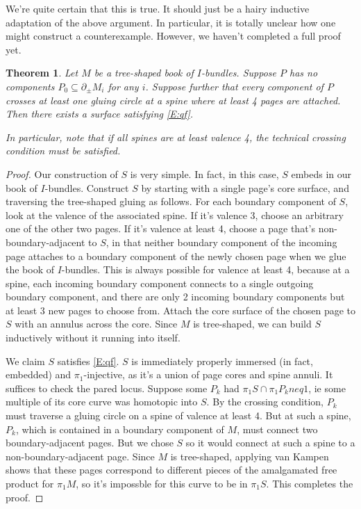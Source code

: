 \documentclass[12pt]{amsart}
\newtheorem{thm}[theorem]{Theorem}
\theoremstyle{definition}
\theoremstyle{remark}
\newcommand{\bd}{\partial}
\newcommand{\cin}{\subseteq}
\begin{document}
{We're quite certain that this is true. It should just be a hairy inductive
adaptation of the above argument. In particular, it is totally unclear how one
might construct a counterexample. However, we haven't completed a full proof
yet.

\begin{thm}

Let $M$ be a tree-shaped book of $I$-bundles. Suppose $P$ has no components
$P_0 \cin \bd_\pm M_i$ for any $i$. Suppose further that every
component of $P$ crosses at least one gluing circle at a spine where at least
4 pages are attached. Then there exists a surface satisfying \eqref{E:qf}.

In particular, note that if all spines are at least valence 4, the technical
crossing condition must be satisfied.

\end{thm}
\begin{proof}

Our construction of $S$ is very simple. In fact, in this case, $S$ embeds in
our book of $I$-bundles. Construct $S$ by starting with a single page's core
surface, and traversing the tree-shaped gluing as follows. For each boundary
component of $S$, look at the valence of the associated spine. If it's valence
3, choose an arbitrary one of the other two pages. If it's valence at least 4,
choose a page that's non-boundary-adjacent to $S$, in that neither boundary
component of the incoming page attaches to a boundary component of the newly
chosen page when we glue the book of $I$-bundles. This is always possible for
valence at least 4, because at a spine, each incoming boundary component
connects to a single outgoing boundary component, and there are only 2 incoming
boundary components but at least 3 new pages to choose from. Attach the core
surface of the chosen page to $S$ with an annulus across the core. Since $M$ is
tree-shaped, we can build $S$ inductively without it running into itself.

We claim $S$ satisfies \eqref{E:qf}. $S$ is immediately properly immersed (in
fact, embedded) and $\pi_1$-injective, as it's a union of page cores and spine
annuli. It suffices to check the pared locus. Suppose some $P_k$ had $\pi_1S
\cap \pi_1P_k neq 1$, ie some multiple of its core curve was homotopic into
$S$. By the crossing condition, $P_k$ must traverse a gluing circle on a spine
of valence at least 4.  But at such a spine, $P_k$, which is contained in
a boundary component of $M$, must connect two boundary-adjacent pages. But we
chose $S$ so it would connect at such a spine to a non-boundary-adjacent page.
Since $M$ is tree-shaped, applying van Kampen shows that these pages correspond
to different pieces of the amalgamated free product for $\pi_1M$, so it's
impossble for this curve to be in $\pi_1S$. This completes the proof.


\end{proof}}
\end{document}
